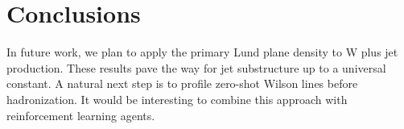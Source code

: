 \section{Conclusions}\label{sec:conclusions}

In future work, we plan to apply the primary Lund plane density to W
plus jet production. These results pave the way for jet substructure up
to a universal constant. A natural next step is to profile zero-shot
Wilson lines before hadronization. It would be interesting to combine
this approach with reinforcement learning agents.

